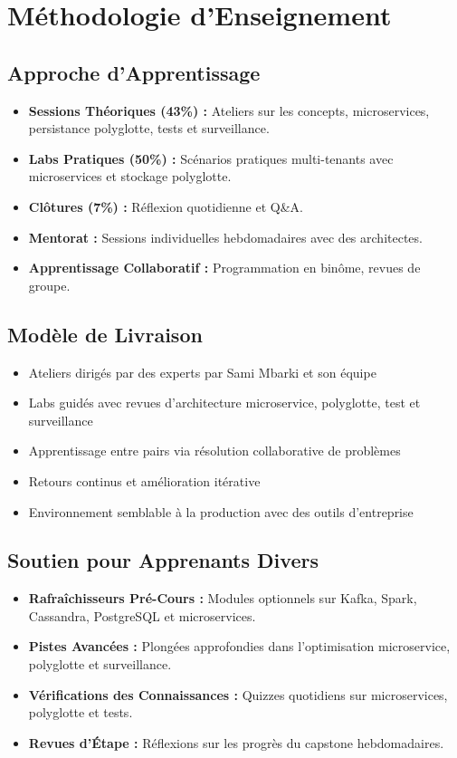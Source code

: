 \documentclass[11pt]{article}
\begin{document}
\section{Méthodologie d'Enseignement}

\subsection{Approche d'Apprentissage}
\begin{itemize}
    \item \textbf{Sessions Théoriques (43\%) :} Ateliers sur les concepts, microservices, persistance polyglotte, tests et surveillance.
    \item \textbf{Labs Pratiques (50\%) :} Scénarios pratiques multi-tenants avec microservices et stockage polyglotte.
    \item \textbf{Clôtures (7\%) :} Réflexion quotidienne et Q\&A.
    \item \textbf{Mentorat :} Sessions individuelles hebdomadaires avec des architectes.
    \item \textbf{Apprentissage Collaboratif :} Programmation en binôme, revues de groupe.
\end{itemize}

\subsection{Modèle de Livraison}
\begin{itemize}
    \item Ateliers dirigés par des experts par Sami Mbarki et son équipe
    \item Labs guidés avec revues d'architecture microservice, polyglotte, test et surveillance
    \item Apprentissage entre pairs via résolution collaborative de problèmes
    \item Retours continus et amélioration itérative
    \item Environnement semblable à la production avec des outils d'entreprise
\end{itemize}

\subsection{Soutien pour Apprenants Divers}
\begin{itemize}
    \item \textbf{Rafraîchisseurs Pré-Cours :} Modules optionnels sur Kafka, Spark, Cassandra, PostgreSQL et microservices.
    \item \textbf{Pistes Avancées :} Plongées approfondies dans l'optimisation microservice, polyglotte et surveillance.
    \item \textbf{Vérifications des Connaissances :} Quizzes quotidiens sur microservices, polyglotte et tests.
    \item \textbf{Revues d'Étape :} Réflexions sur les progrès du capstone hebdomadaires.
\end{itemize}
\end{document}
